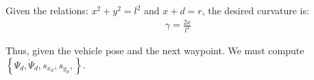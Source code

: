 \noindent Given the relations: $x^2+y^2=l^2$ and $x+d=r$, the desired curvature is:
\begin{align}
\gamma=\frac{2x}{l^2}
\end{align}




\noindent Thus, given the vehicle pose and the next waypoint. We must compute $\left\{\Psi_d, \dot{\Psi}_d, s_{x_d}, s_{y_d},\right\}$. 

